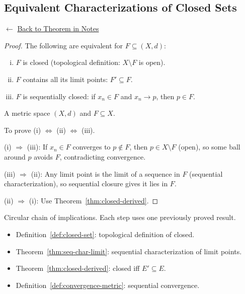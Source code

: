 
\subsection*{Equivalent Characterizations of Closed Sets}
\label{prf:closed-equiv}

\begin{remark*}[Return]
$\leftarrow$ \hyperref[thm:closed-equiv]{Back to Theorem in Notes}
\end{remark*}

\begin{proof}
\Claim The following are equivalent for $F \subseteq (X,d)$:
\begin{enumerate}[(i)]
  \item $F$ is closed (topological definition: $X \setminus F$ is open).
  \item $F$ contains all its limit points: $F' \subseteq F$.
  \item $F$ is sequentially closed: if $x_n \in F$ and $x_n \to p$, then $p \in F$.
\end{enumerate}

\Given A metric space $(X,d)$ and $F \subseteq X$.

\Goal To prove (i) $\Leftrightarrow$ (ii) $\Leftrightarrow$ (iii).

\Strategy
(i) $\Rightarrow$ (iii): If $x_n \in F$ converges to $p \notin F$, then
$p \in X \setminus F$ (open), so some ball around $p$ avoids $F$,
contradicting convergence.

(iii) $\Rightarrow$ (ii): Any limit point is the limit of a sequence in $F$
(sequential characterization), so sequential closure gives it lies in $F$.

(ii) $\Rightarrow$ (i): Use Theorem~\ref{thm:closed-derived}.


\end{proof}

\begin{remark*}
Circular chain of implications. Each step uses one previously proved result.
\end{remark*}

\begin{remark*}[Dependencies]
\begin{itemize}
  \item Definition~\ref{def:closed-set}: topological definition of closed.
  \item Theorem~\ref{thm:seq-char-limit}: sequential characterization of limit points.
  \item Theorem~\ref{thm:closed-derived}: closed iff $E' \subseteq E$.
  \item Definition~\ref{def:convergence-metric}: sequential convergence.
\end{itemize}
\end{remark*}
